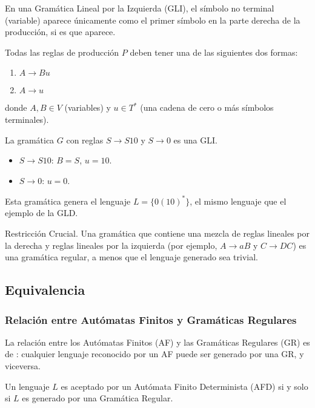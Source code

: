 En una Gramática Lineal por la Izquierda (GLI), el símbolo no terminal (variable) aparece únicamente como el primer símbolo en la parte derecha de la producción, si es que aparece.

\begin{definicion}
Todas las reglas de producción $P$ deben tener una de las siguientes dos formas:
\begin{enumerate}
    \item $A \to Bu$
    \item $A \to u$
\end{enumerate}
donde $A, B \in V$ (variables) y $u \in T^*$ (una cadena de cero o más símbolos terminales).
\end{definicion}

\begin{ejemplo}[GLI]
La gramática $G$ con reglas $S \to S10$ y $S \to 0$ es una GLI.
\begin{itemize}
    \item $S \to S10$: $B=S$, $u=10$.
    \item $S \to 0$: $u=0$.
\end{itemize}
Esta gramática genera el lenguaje $L = \{0(10)^*\}$, el mismo lenguaje que el ejemplo de la GLD.
\end{ejemplo}

\begin{anotacion}{Restricción Crucial.}
Una gramática que contiene una mezcla de reglas lineales por la derecha y reglas lineales por la izquierda (por ejemplo, $A \to aB$ y $C \to DC$)  es una gramática regular, a menos que el lenguaje generado sea trivial.
\end{anotacion}

\subsection{Equivalencia} %

\subsubsection{Relación entre Autómatas Finitos y Gramáticas Regulares}

La relación entre los Autómatas Finitos (AF) y las Gramáticas Regulares (GR) es de : cualquier lenguaje reconocido por un AF puede ser generado por una GR, y viceversa.

\begin{teorema}
Un lenguaje $L$ es aceptado por un Autómata Finito Determinista (AFD) si y solo si $L$ es generado por una Gramática Regular.
\end{teorema}

